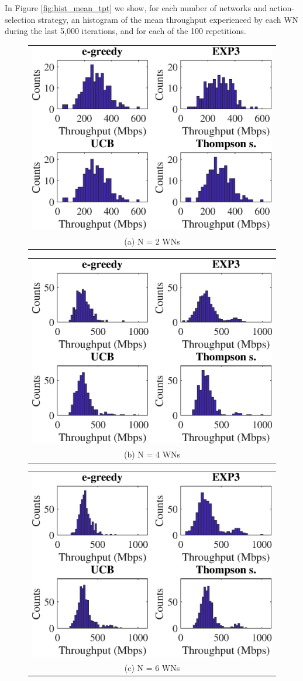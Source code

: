 \documentclass[10pt,journal,compsoc]{IEEEtran}
\begin{document}
	In Figure \ref{fig:hist_mean_tpt} we show, for each number of networks and action-selection strategy, an histogram of the mean throughput experienced by each WN during the last 5,000 iterations, and for each of the 100 repetitions.
	\begin{figure}
		\centering
		\begin{tabular}{@{}c@{}}
			\includegraphics[width=.35\textwidth]{images/hist_mean_tpt_2_WNs} \\[\abovecaptionskip]
			\small (a) N = 2 WNs
			\label{fig:hist_mean_throughput_2}
		\end{tabular}	
		\hspace{\floatsep}	
		\begin{tabular}{@{}c@{}}
			\includegraphics[width=.35\textwidth]{images/hist_mean_tpt_4_WNs} \\[\abovecaptionskip]
			\small (b) N = 4 WNs
			\label{fig:hist_mean_throughput_4}
		\end{tabular}
		\hspace{\floatsep}
		\begin{tabular}{@{}c@{}}
			\includegraphics[width=.35\textwidth]{images/hist_mean_tpt_6_WNs} \\[\abovecaptionskip]
			\small (c) N = 6 WNs
			\label{fig:hist_mean_throughput_6}
		\end{tabular}
		\hspace{\floatsep}

\end{figure}
\end{document}
